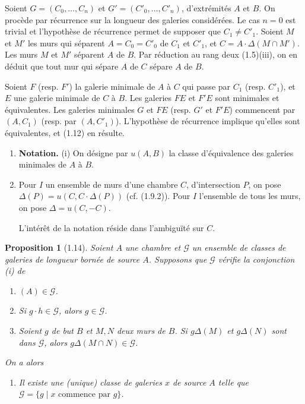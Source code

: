 \documentclass[12pt]{article}
\newtheorem{proposition}[theoreme]{Proposition}
\theoremstyle{remark}
\begin{document}
Soient $G = (C_0, \ldots, C_n)$ et $G' = (C'_0, \ldots, C'_n)$, d'extrémités $A$ et $B$. On procède par récurrence sur la longueur des galeries considérées. Le cas $n = 0$ est trivial et l'hypothèse de récurrence permet de supposer que $C_1 \neq C'_1$. Soient $M$ et $M'$ les murs qui séparent $A = C_0 = C'_0$ de $C_1$ et $C'_1$, et $C = A \cdot \Delta(M \cap M')$. Les murs $M$ et $M'$ séparent $A$ de $B$. Par réduction au rang deux (1.5)(iii), on en déduit que tout mur qui sépare $A$ de $C$ sépare $A$ de $B$.

\medskip
\begin{center}
\end{center}

Soient $F$ (resp. $F'$) la galerie minimale de $A$ à $C$ qui passe par $C_1$ (resp. $C'_1$), et $E$ une galerie minimale de $C$ à $B$. Les galeries $FE$ et $F'E$ sont minimales et équivalentes. Les galeries minimales $G$ et $FE$ (resp. $G'$ et $F'E$) commencent par $(A, C_1)$ (resp. par $(A, C'_1)$). L'hypothèse de récurrence implique qu'elles sont équivalentes, et (1.12) en résulte.

\begin{enumerate}
\item[(1.13)] \textbf{Notation.} (i) On désigne par $u(A, B)$ la classe d'équivalence des galeries minimales de $A$ à $B$.

\item[(ii)] Pour $I$ un ensemble de murs d'une chambre $C$, d'intersection $P$, on pose $\Delta(P) = u(C, C \cdot \Delta(P))$ (cf. (1.9.2)). Pour $I$ l'ensemble de tous les murs, on pose $\Delta = u(C, -C)$.

L'intérêt de la notation réside dans l'ambiguïté sur $C$.
\end{enumerate}

\begin{proposition}[1.14]
Soient $A$ une chambre et $\mathscr{G}$ un ensemble de classes de galeries de longueur bornée de source $A$. Supposons que $\mathscr{G}$ vérifie la conjonction (i) de
\begin{enumerate}
\item[(i$_a$)] $(A) \in \mathscr{G}$.
\item[(i$_b$)] Si $g \cdot h \in \mathscr{G}$, alors $g \in \mathscr{G}$.
\item[(i$_c$)] Soient $g$ de but $B$ et $M, N$ deux murs de $B$. Si $g \Delta(M)$ et $g \Delta(N)$ sont dans $\mathscr{G}$, alors $g \Delta(M \cap N) \in \mathscr{G}$.
\end{enumerate}
On a alors
\begin{enumerate}
\item[(ii)] Il existe une (unique) classe de galeries $x$ de source $A$ telle que $\mathscr{G} = \{g \mid x \text{ commence par } g\}$.
\end{enumerate}
\end{proposition}
\end{document}
